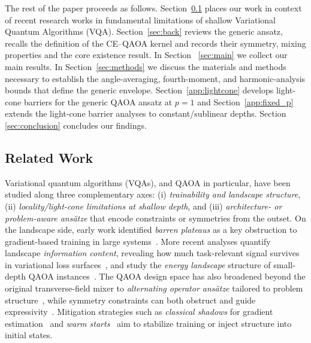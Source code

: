 \documentclass[a4paper,onecolumn,11pt,unpublished]{quantumarticle}
\theoremstyle{remark}
\begin{document}

\medskip
\noindent
The rest of the paper proceeds as follows. Section~\ref{sec:related} places our work in context of recent research works in fundamental limitations of shallow Variational Quantum Algorithms (VQA). Section~\ref{sec:back} reviews the generic ansatz, recalls the definition of the CE–QAOA kernel and records their symmetry, mixing properties and the core existence result. In Section~ \ref{sec:main} we collect our main results. In Section~\ref{sec:methods} we discuss the materials and methods necessary to establish the angle-averaging, fourth-moment, and harmonic-analysis bounds that define the generic envelope. Section~\ref{app:lightcone} develops light-cone barriers for the generic QAOA ansatz at $p=1$ and Section~\ref{app:fixed_p} extends the light-cone barrier analyses to constant/sublinear depths. Section \ref{sec:conclusion} concludes our findings. 







\subsection{Related Work}
\label{sec:related}

Variational quantum algorithms (VQAs), and QAOA in particular, have been studied along three complementary axes: (i) \emph{trainability and landscape structure}, (ii) \emph{locality/light-cone limitations at shallow depth}, and (iii) \emph{architecture- or problem-aware ans\"atze} that encode constraints or symmetries from the outset. 
On the landscape side, early work identified \emph{barren plateaus} as a key obstruction to gradient-based training in large systems~\cite{McClean2018BarrenPlateaus,Cerezo2021VQAReview}. 
More recent analyses quantify landscape \emph{information content}, revealing how much task-relevant signal survives in variational loss surfaces~\cite{PerezSalinasWangBonetMonroig2024}, and study the \emph{energy landscape} structure of small-depth QAOA instances~\cite{choy2024energylandscapesquantumapproximate}. 
The QAOA design space has also broadened beyond the original transverse-field mixer to \emph{alternating operator ans\"atze} tailored to problem structure~\cite{HadfieldHoggRieffel2022}, while symmetry constraints can both obstruct and guide expressivity~\cite{Bravyi_2020}. 
Mitigation strategies such as \emph{classical shadows} for gradient estimation~\cite{SackMedinaMichailidisKuengSerbyn2022} and \emph{warm starts}~\cite{Egger2021Warm} aim to stabilize training or inject structure into initial states.
\end{document}
